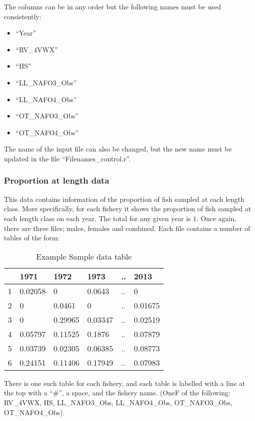 \documentclass[12pt,a4paper]{article}
\begin{document}
The columns can be in any order but the following names must be used consistently: 

\begin{itemize}
\item ``Year''
\item ``RV\_4VWX''
\item ``HS''
\item ``LL\_NAFO3\_Obs''
\item ``LL\_NAFO4\_Obs''
\item ``OT\_NAFO3\_Obs''
\item ``OT\_NAFO4\_Obs''
\end{itemize}

The name of the input file can also be changed, but the new name must be updated in the file ``Filenames\_control.r''.

\subsubsection{Proportion at length data}

This data contains information of the proportion of fish sampled at each length class. More specifically, for each fishery it shows the proportion of fish sampled at each length class on each year. The total for any given year is $1$. Once again, there are three files; males, females and combined. Each file contains a number of tables of the form:

\begin{table}[ht]
\centering
{\tiny
\begin{tabular}{rlllll}
  \hline
 & 1971 & 1972 & 1973 & .. & 2013 \\ 
  \hline
1 & 0.02058 & 0 & 0.0643 & .. & 0 \\ 
  2 & 0 & 0.0461 & 0 & .. & 0.01675 \\ 
  3 & 0 & 0.29965 & 0.03347 & .. & 0.02519 \\ 
  4 & 0.05797 & 0.11525 & 0.1876 & .. & 0.07879 \\ 
  5 & 0.03739 & 0.02305 & 0.06385 & .. & 0.08773 \\ 
  6 & 0.24151 & 0.11406 & 0.17949 & .. & 0.07983 \\ 
   \hline
\end{tabular}
}
\caption{Example Sample data table} 
\end{table}
There is one such table for each fishery, and each table is labelled with a line at the top with a ``\#'', a space, and the fishery name. (OneF of the following:  RV\_4VWX, HS, LL\_NAFO3\_Obs, LL\_NAFO4\_Obs, OT\_NAFO3\_Obs, OT\_NAFO4\_Obs).
\end{document}
